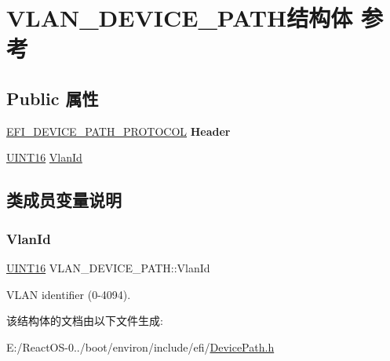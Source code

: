 \hypertarget{struct_v_l_a_n___d_e_v_i_c_e___p_a_t_h}{}\section{V\+L\+A\+N\+\_\+\+D\+E\+V\+I\+C\+E\+\_\+\+P\+A\+T\+H结构体 参考}
\label{struct_v_l_a_n___d_e_v_i_c_e___p_a_t_h}
\subsection*{Public 属性}
\begin{DoxyCompactItemize}
\item 
\mbox{\label{struct_v_l_a_n___d_e_v_i_c_e___p_a_t_h_a7c4ce0140f8a0326b2bbd95269596bb7}} 
\hyperlink{struct_e_f_i___d_e_v_i_c_e___p_a_t_h___p_r_o_t_o_c_o_l}{E\+F\+I\+\_\+\+D\+E\+V\+I\+C\+E\+\_\+\+P\+A\+T\+H\+\_\+\+P\+R\+O\+T\+O\+C\+OL} {\bfseries Header}
\item 
\hyperlink{_processor_bind_8h_a09f1a1fb2293e33483cc8d44aefb1eb1}{U\+I\+N\+T16} \hyperlink{struct_v_l_a_n___d_e_v_i_c_e___p_a_t_h_a323f5d07915caca6f60de60fc3e3126e}{Vlan\+Id}
\end{DoxyCompactItemize}


\subsection{类成员变量说明}
\mbox{\label{struct_v_l_a_n___d_e_v_i_c_e___p_a_t_h_a323f5d07915caca6f60de60fc3e3126e}} 
\subsubsection{\texorpdfstring{Vlan\+Id}{VlanId}}
{\footnotesize\ttfamily \hyperlink{_processor_bind_8h_a09f1a1fb2293e33483cc8d44aefb1eb1}{U\+I\+N\+T16} V\+L\+A\+N\+\_\+\+D\+E\+V\+I\+C\+E\+\_\+\+P\+A\+T\+H\+::\+Vlan\+Id}

V\+L\+AN identifier (0-\/4094). 

该结构体的文档由以下文件生成\+:\begin{DoxyCompactItemize}
\item 
E\+:/\+React\+O\+S-\/0../boot/environ/include/efi/\hyperlink{_device_path_8h}{Device\+Path.\+h}\end{DoxyCompactItemize}
